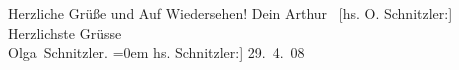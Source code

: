 \begin{ledgroupsized}[t]{13cm}
           \pstart
           Herzliche Grüße \introOben{}und Auf Wiedersehen!\introOben{}\pend
           \pstart Dein \spacefill\mbox{Arthur }\pend{}\pstart
           {[}hs. O. Schnitzler:{]} Herzlichste Grüsse{\\[\baselineskip]}\spacefill\mbox{Olga Schnitzler.}\pend
           \leftskip=0em{}\pstart
           \noindent{}{[}hs. Schnitzler:{]} 29. 4. 08\pend
           \endnumbering{}\end{ledgroupsized}  \newcommand{\dateiname}{L01767}\newcommand{\titel}{Arthur und Olga Schnitzler an Hermann Bahr, 29. 4. 1908}\newcommand{\editorInnen}{ Kurt Ifkovits,  Martin Anton Müller}
      